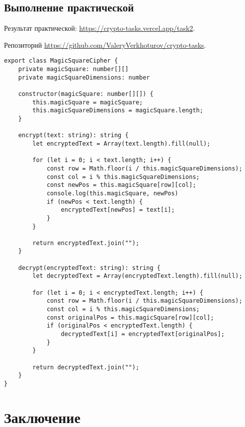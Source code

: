 \subsection{Выполнение практической}

Результат практической: \url{https://crypto-tasks.vercel.app/task2}.

Репозиторий \url{https://github.com/ValeryVerkhoturov/crypto-tasks}.

\begin{lstlisting}[caption={Шифр Магический квадрат}, label=lst:2]
export class MagicSquareCipher {
	private magicSquare: number[][]
	private magicSquareDimensions: number
	
	constructor(magicSquare: number[][]) {
		this.magicSquare = magicSquare;
		this.magicSquareDimensions = magicSquare.length;
	}
	
	encrypt(text: string): string {
		let encryptedText = Array(text.length).fill(null);
		
		for (let i = 0; i < text.length; i++) {
			const row = Math.floor(i / this.magicSquareDimensions);
			const col = i % this.magicSquareDimensions;
			const newPos = this.magicSquare[row][col];
			console.log(this.magicSquare, newPos)
			if (newPos < text.length) {
				encryptedText[newPos] = text[i];
			}
		}
		
		return encryptedText.join("");
	}
	
	decrypt(encryptedText: string): string {
		let decryptedText = Array(encryptedText.length).fill(null);
		
		for (let i = 0; i < encryptedText.length; i++) {
			const row = Math.floor(i / this.magicSquareDimensions);
			const col = i % this.magicSquareDimensions;
			const originalPos = this.magicSquare[row][col];
			if (originalPos < encryptedText.length) {
				decryptedText[i] = encryptedText[originalPos];
			}
		}
		
		return decryptedText.join("");
	}
}
\end{lstlisting}







\section*{Заключение}
{}


